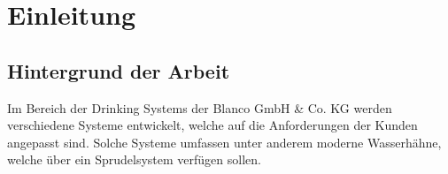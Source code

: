 \chapter{Einleitung}\label{chap:einleitung}
\section{Hintergrund der Arbeit}

Im Bereich der Drinking Systems der Blanco GmbH \& Co. KG werden verschiedene Systeme entwickelt, welche auf die Anforderungen der Kunden angepasst sind. 
Solche Systeme umfassen unter anderem moderne Wasserhähne, welche über ein Sprudelsystem verfügen sollen. 
